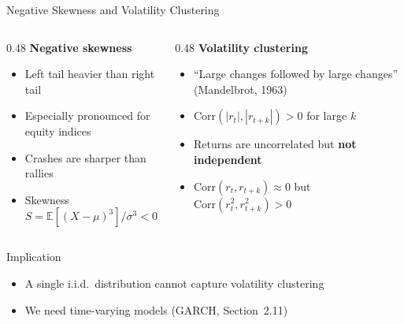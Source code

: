 \documentclass[9pt, aspectratio=169, t]{beamer}
\theoremstyle{definition}
\newcommand{\E}{\mathbb{E}}
\newcommand{\Corr}{\text{Corr}}
\begin{document}
\begin{frame}{Negative Skewness and Volatility Clustering}
\begin{columns}[T]
\begin{column}{0.48\textwidth}
\textbf{Negative skewness}
\begin{itemize}
\item Left tail heavier than right tail
\item Especially pronounced for equity indices
\item Crashes are sharper than rallies
\item Skewness $S = \E[(X-\mu)^3]/\sigma^3 < 0$
\end{itemize}
\end{column}
\begin{column}{0.48\textwidth}
\textbf{Volatility clustering}
\begin{itemize}
\item ``Large changes followed by large changes'' (Mandelbrot, 1963)
\item $\Corr(|r_t|, |r_{t+k}|) > 0$ for large $k$
\item Returns are uncorrelated but \textbf{not independent}
\item $\Corr(r_t, r_{t+k}) \approx 0$ but $\Corr(r_t^2, r_{t+k}^2) > 0$
\end{itemize}
\end{column}
\end{columns}

\vspace{0.3cm}
\begin{block}{Implication}
\begin{itemize}
\item A single i.i.d.\ distribution cannot capture volatility clustering
\item We need time-varying models (GARCH, Section~2.11)
\end{itemize}
\end{block}
\end{frame}
\end{document}
